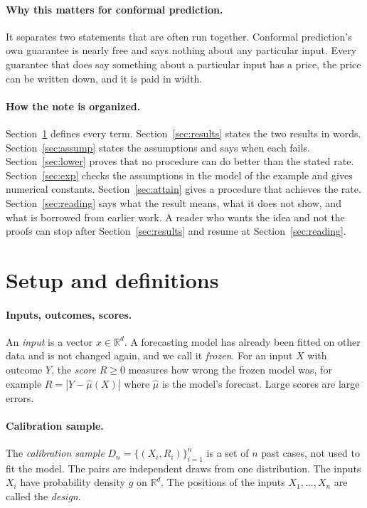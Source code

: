 \documentclass[11pt]{article}
\theoremstyle{definition}
\theoremstyle{remark}
\newcommand{\R}{\mathbb{R}}
\begin{document}
\paragraph{Why this matters for conformal prediction.}
It separates two statements that are often run together. Conformal prediction's own
guarantee is nearly free and says nothing about any particular input. Every guarantee that
does say something about a particular input has a price, the price can be written down, and
it is paid in width.

\paragraph{How the note is organized.}
Section~\ref{sec:setup} defines every term. Section~\ref{sec:results} states the two
results in words. Section~\ref{sec:assump} states the assumptions and says when each fails.
Section~\ref{sec:lower} proves that no procedure can do better than the stated rate.
Section~\ref{sec:exp} checks the assumptions in the model of the example and gives
numerical constants. Section~\ref{sec:attain} gives a procedure that achieves the rate.
Section~\ref{sec:reading} says what the result means, what it does not show, and what is
borrowed from earlier work. A reader who wants the idea and not the proofs can stop after
Section~\ref{sec:results} and resume at Section~\ref{sec:reading}.

\section{Setup and definitions}\label{sec:setup}

\paragraph{Inputs, outcomes, scores.}
An \emph{input} is a vector $x\in\R^d$. A forecasting model has already been fitted on other
data and is not changed again, and we call it \emph{frozen}. For an input $X$ with outcome
$Y$, the \emph{score} $R\ge0$ measures how wrong the frozen model was, for example
$R=|Y-\hat\mu(X)|$ where $\hat\mu$ is the model's forecast. Large scores are large errors.

\paragraph{Calibration sample.}
The \emph{calibration sample} $D_n=\{(X_i,R_i)\}_{i=1}^n$ is a set of $n$ past cases, not
used to fit the model. The pairs are independent draws from one distribution. The inputs
$X_i$ have probability density $g$ on $\R^d$. The positions of the inputs $X_1,\dots,X_n$
are called the \emph{design}.
\end{document}
